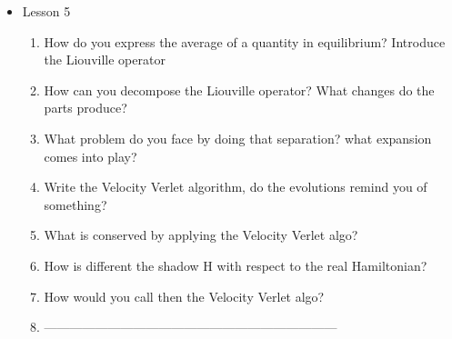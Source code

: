{\begin{itemize}
\begin{enumerate}
        \item How are interactions classified as short and long?
        \item Write formula for short potential and long range potential (consider PBC)
        \item How do you select a cut-off for the short range interactions?
        \item What is the minimum image convention?
        \item What is the Verlet list algorithm
        \item How do you avoid bumps in short potential?
        \item How do you calculate long range potential? %
        \item Which is the fundamental concept around statistical mechanics?
        \item What is an integrator? How does it use time?
        \item Write Euler integrator
        \item What is the problem with the Euler integrator?
        \item What is the Euler-Cromer integrator?
        \item What is the mathematical difference between the two previous integrators?
        \item What is the meaning of symplectic?
        \item What is a unitary matrix
    \end{enumerate}
    \item Lesson 5
    \begin{enumerate}
        \item How do you express the average of a quantity in equilibrium? Introduce the Liouville operator
        \item How can you decompose the Liouville operator? What changes do the parts produce?
        \item What problem do you face by doing that separation? what expansion comes into play?
        \item Write the Velocity Verlet algorithm, do the evolutions remind you of something?
        \item What is conserved by applying the Velocity Verlet algo?
        \item How is different the shadow H with respect to the real Hamiltonian?
        \item How would you call then the Velocity Verlet algo?
        \item ---------------------------------------------------------------------

\end{enumerate}
\end{itemize}}
